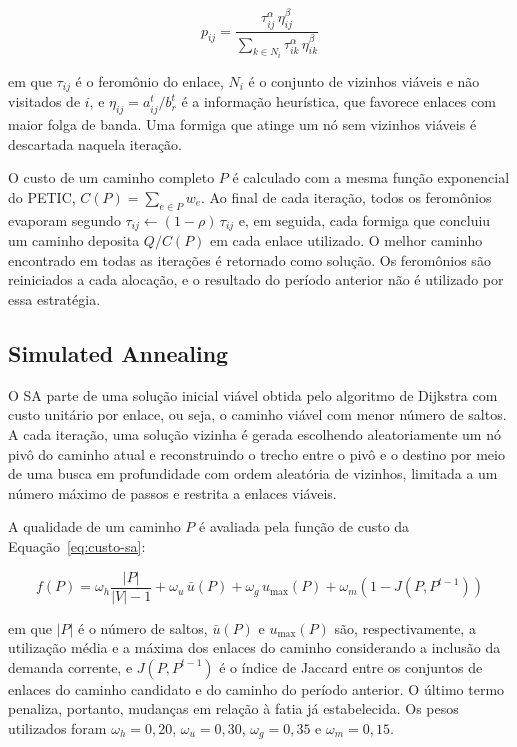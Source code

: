 \begin{equation}
    p_{ij} = \frac{\tau_{ij}^{\alpha} \, \eta_{ij}^{\beta}}{\sum_{k \in N_i} \tau_{ik}^{\alpha} \, \eta_{ik}^{\beta}}
    \label{eq:prob-aco}
\end{equation}

\noindent em que $\tau_{ij}$ é o feromônio do enlace, $N_i$ é o conjunto de vizinhos viáveis e não visitados de $i$, e $\eta_{ij} = a_{ij}^t / b_r^t$ é a informação heurística, que favorece enlaces com maior folga de banda. Uma formiga que atinge um nó sem vizinhos viáveis é descartada naquela iteração.

O custo de um caminho completo $P$ é calculado com a mesma função exponencial do PETIC, $C(P) = \sum_{e \in P} w_e$. Ao final de cada iteração, todos os feromônios evaporam segundo $\tau_{ij} \leftarrow (1 - \rho)\,\tau_{ij}$ e, em seguida, cada formiga que concluiu um caminho deposita $Q / C(P)$ em cada enlace utilizado. O melhor caminho encontrado em todas as iterações é retornado como solução. Os feromônios são reiniciados a cada alocação, e o resultado do período anterior não é utilizado por essa estratégia.

\subsection{Simulated Annealing}
\label{subsec:impl-sa}

O SA parte de uma solução inicial viável obtida pelo algoritmo de Dijkstra com custo unitário por enlace, ou seja, o caminho viável com menor número de saltos. A cada iteração, uma solução vizinha é gerada escolhendo aleatoriamente um nó pivô do caminho atual e reconstruindo o trecho entre o pivô e o destino por meio de uma busca em profundidade com ordem aleatória de vizinhos, limitada a um número máximo de passos e restrita a enlaces viáveis.

A qualidade de um caminho $P$ é avaliada pela função de custo da Equação~\ref{eq:custo-sa}:

\begin{equation}
    f(P) = \omega_h \frac{|P|}{|V| - 1} + \omega_u \, \bar{u}(P) + \omega_g \, u_{\max}(P) + \omega_m \left(1 - J(P, P^{t-1})\right)
    \label{eq:custo-sa}
\end{equation}

\noindent em que $|P|$ é o número de saltos, $\bar{u}(P)$ e $u_{\max}(P)$ são, respectivamente, a utilização média e a máxima dos enlaces do caminho considerando a inclusão da demanda corrente, e $J(P, P^{t-1})$ é o índice de Jaccard entre os conjuntos de enlaces do caminho candidato e do caminho do período anterior. O último termo penaliza, portanto, mudanças em relação à fatia já estabelecida. Os pesos utilizados foram $\omega_h = 0{,}20$, $\omega_u = 0{,}30$, $\omega_g = 0{,}35$ e $\omega_m = 0{,}15$.

